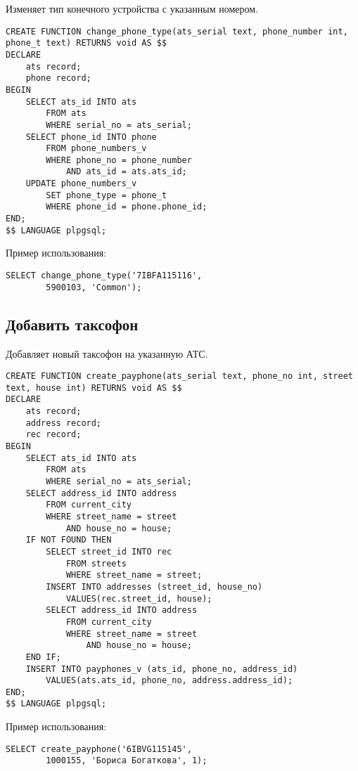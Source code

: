 \documentclass{report}
\begin{document}
Изменяет тип конечного устройства с указанным номером.

\begin{lstlisting}
CREATE FUNCTION change_phone_type(ats_serial text, phone_number int, phone_t text) RETURNS void AS $$
DECLARE
    ats record;
    phone record;
BEGIN
    SELECT ats_id INTO ats 
        FROM ats 
        WHERE serial_no = ats_serial;
    SELECT phone_id INTO phone
        FROM phone_numbers_v
        WHERE phone_no = phone_number
            AND ats_id = ats.ats_id;
    UPDATE phone_numbers_v
        SET phone_type = phone_t 
        WHERE phone_id = phone.phone_id;
END;
$$ LANGUAGE plpgsql;
\end{lstlisting}

Пример использования:
\begin{lstlisting}
SELECT change_phone_type('7IBFA115116',
        5900103, 'Common');
\end{lstlisting}

\subsection*{Добавить таксофон}

Добавляет новый таксофон на указанную АТС.

\begin{lstlisting}
CREATE FUNCTION create_payphone(ats_serial text, phone_no int, street text, house int) RETURNS void AS $$
DECLARE
    ats record;
    address record;
    rec record;
BEGIN
    SELECT ats_id INTO ats 
        FROM ats 
        WHERE serial_no = ats_serial;
    SELECT address_id INTO address
        FROM current_city
        WHERE street_name = street
            AND house_no = house;
    IF NOT FOUND THEN
        SELECT street_id INTO rec 
            FROM streets 
            WHERE street_name = street;
        INSERT INTO addresses (street_id, house_no)
            VALUES(rec.street_id, house);
        SELECT address_id INTO address
            FROM current_city
            WHERE street_name = street
                AND house_no = house;
    END IF;
    INSERT INTO payphones_v (ats_id, phone_no, address_id)
        VALUES(ats.ats_id, phone_no, address.address_id);
END;
$$ LANGUAGE plpgsql;
\end{lstlisting}

Пример использования:
\begin{lstlisting}
SELECT create_payphone('6IBVG115145',
        1000155, 'Бориса Богаткова', 1);
\end{lstlisting}
\end{document}
